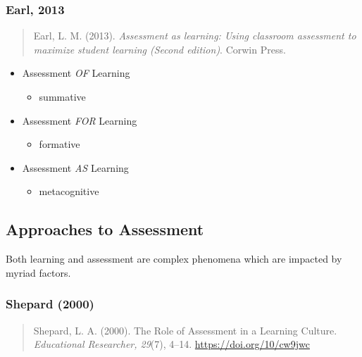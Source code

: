 \documentclass[
]{book}
\providecommand{\tightlist}{%
  \setlength{\itemsep}{0pt}\setlength{\parskip}{0pt}}
\begin{document}
\hypertarget{earl-2013}{%
\subsubsection*{Earl, 2013}\label{earl-2013}}

\begin{quote}
Earl, L. M. (2013). \emph{Assessment as learning: Using classroom assessment to maximize student learning (Second edition)}. Corwin Press.
\end{quote}

\begin{itemize}
\tightlist
\item
  Assessment \emph{OF} Learning

  \begin{itemize}
  \tightlist
  \item
    summative
  \end{itemize}
\item
  Assessment \emph{FOR} Learning

  \begin{itemize}
  \tightlist
  \item
    formative
  \end{itemize}
\item
  Assessment \emph{AS} Learning

  \begin{itemize}
  \tightlist
  \item
    metacognitive
  \end{itemize}
\end{itemize}

\hypertarget{approaches-to-assessment}{%
\subsection*{Approaches to Assessment}\label{approaches-to-assessment}}

Both learning and assessment are complex phenomena which are impacted by myriad factors.

\hypertarget{shepard-2000}{%
\subsubsection*{Shepard (2000)}\label{shepard-2000}}

\begin{quote}
Shepard, L. A. (2000). The Role of Assessment in a Learning Culture. \emph{Educational Researcher, 29}(7), 4--14. \url{https://doi.org/10/cw9jwc}
\end{quote}
\end{document}
